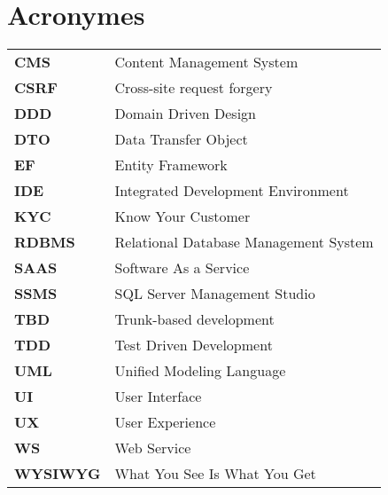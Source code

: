 \chapter{Acronymes}


\begin{tabular}{l l}


    \textbf{CMS}     & Content Management System             \\
    \textbf{CSRF}    & Cross-site request forgery            \\
    \textbf{DDD}     & Domain Driven Design                  \\



    \textbf{DTO}     & Data Transfer Object                  \\

    \textbf{EF}      & Entity Framework                      \\

    \textbf{IDE}     & Integrated Development Environment    \\

    \textbf{KYC}     & Know Your Customer                    \\

    \textbf{RDBMS}   & Relational Database Management System \\

    \textbf{SAAS}    & Software As a Service                 \\

    \textbf{SSMS}    & SQL Server Management Studio          \\

    \textbf{TBD}     & Trunk-based development               \\
    \textbf{TDD}     & Test Driven Development               \\


    \textbf{UML}     & Unified Modeling Language             \\

    \textbf{UI}      & User Interface                        \\

    \textbf{UX}      & User Experience                       \\

    \textbf{WS}      & Web Service                           \\

    \textbf{WYSIWYG} & What You See Is What You Get          \\



\end{tabular}

\pagebreak

